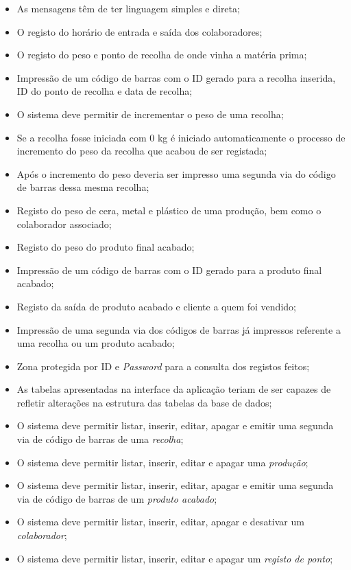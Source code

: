 \begin{itemize}
	\item As mensagens têm de ter linguagem simples e direta;
	\item O registo do horário de entrada e saída dos colaboradores;
	\item O registo do peso e ponto de recolha de onde vinha a matéria prima;
	\item Impressão de um código de barras com o ID gerado para a recolha inserida, ID do ponto de recolha e data de recolha;
	\item O sistema deve permitir de incrementar o peso de uma recolha;
	\item Se a recolha fosse iniciada com 0 kg é iniciado automaticamente o processo de incremento do peso da recolha que acabou de ser registada;
	\item Após o incremento do peso deveria ser impresso uma segunda via do código de barras dessa mesma recolha;
	\item Registo do peso de cera, metal e plástico de uma produção, bem como o colaborador associado;
	\item Registo do peso do produto final acabado;
	\item Impressão de um código de barras com o ID gerado para a produto final acabado;
	\item Registo da saída de produto acabado e cliente a quem foi vendido;
	\item Impressão de uma segunda via dos códigos de barras já impressos referente a uma recolha ou um produto acabado;
	\item Zona protegida por ID e \textit{Password} para a consulta dos registos feitos;
	\item As tabelas apresentadas na interface da aplicação teriam de ser capazes de refletir alterações na estrutura das tabelas da base de dados;
	\item O sistema deve permitir listar, inserir, editar, apagar e emitir uma segunda via de código de barras de uma \textit{recolha};
	\item O sistema deve permitir listar, inserir, editar e apagar uma \textit{produção};
	\item O sistema deve permitir listar, inserir, editar, apagar e emitir uma segunda via de código de barras de um \textit{produto acabado};
	\item O sistema deve permitir listar, inserir, editar, apagar e desativar um \textit{colaborador};
	\item O sistema deve permitir listar, inserir, editar e apagar um \textit{registo de ponto};

\end{itemize}
